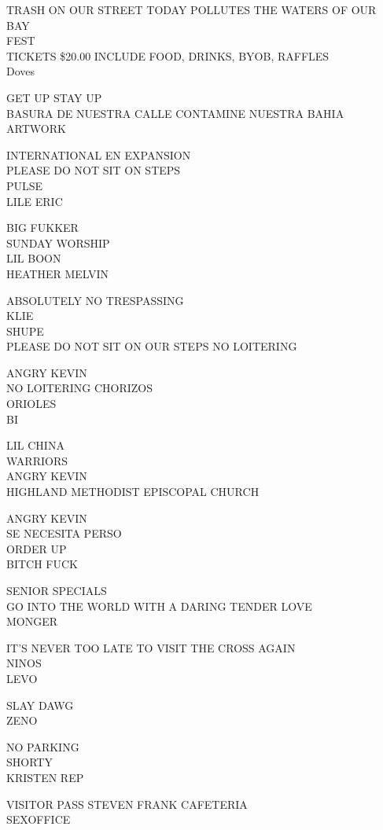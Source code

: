 \documentclass[10pt,letterpaper]{article}
\begin{document}
TRASH ON OUR STREET TODAY POLLUTES THE WATERS OF OUR BAY\\
FEST\\
TICKETS \$20.00 INCLUDE FOOD, DRINKS, BYOB, RAFFLES\\
Doves

GET UP STAY UP\\
BASURA DE NUESTRA CALLE CONTAMINE NUESTRA BAHIA\\
ARTWORK

INTERNATIONAL EN EXPANSION\\
PLEASE DO NOT SIT ON STEPS\\
PULSE\\
LILE ERIC

BIG FUKKER\\
SUNDAY WORSHIP\\
LIL BOON\\
HEATHER MELVIN

ABSOLUTELY NO TRESPASSING\\
KLIE\\
SHUPE\\
PLEASE DO NOT SIT ON OUR STEPS NO LOITERING

ANGRY KEVIN\\
NO LOITERING CHORIZOS\\
ORIOLES\\
BI

LIL CHINA\\
WARRIORS\\
ANGRY KEVIN\\
HIGHLAND METHODIST EPISCOPAL CHURCH

ANGRY KEVIN\\
SE NECESITA PERSO\\
ORDER UP\\
BITCH FUCK

SENIOR SPECIALS\\
GO INTO THE WORLD WITH A DARING TENDER LOVE\\
MONGER

IT'S NEVER TOO LATE TO VISIT THE CROSS AGAIN\\
NINOS\\
LEVO

SLAY DAWG\\
ZENO

NO PARKING\\
SHORTY\\
KRISTEN REP

VISITOR PASS STEVEN FRANK CAFETERIA\\
SEXOFFICE
\end{document}
